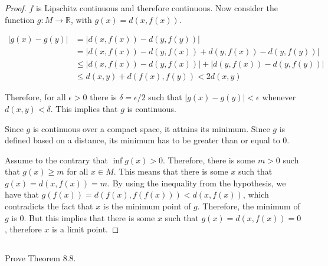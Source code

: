 \begin{proof}
$f$ is Lipschitz continuous and therefore continuous. Now consider the function $g:M \rightarrow \mathbb{R}$, with $g(x) = d(x, f(x))$.

\begin{align*}
|g(x) - g(y)| &= |d(x,f(x)) - d(y, f(y))| \\
                &= |d(x,f(x)) - d(y, f(x)) + d(y, f(x)) - d(y, f(y))| \\
                &\leq |d(x,f(x)) - d(y, f(x))| + |d(y, f(x)) - d(y, f(y))| \\
                &\leq d(x,y) + d(f(x), f(y)) < 2d(x,y)
\end{align*}

Therefore, for all $\epsilon > 0$ there is $\delta = \epsilon/2$ such that $|g(x) - g(y)| < \epsilon$ whenever $d(x,y) < \delta$. This implies that $g$ is continuous.

Since $g$ is continuous over a compact space, it attains its minimum. Since $g$ is defined based on a distance, its minimum has to be greater than or equal to 0.

Assume to the contrary that $\inf g(x) > 0$. Therefore, there is some $m > 0$ such that $g(x) \geq m$ for all $x \in M$. This means that there is some $x$ such that $g(x) = d(x, f(x)) = m$. By using the inequality from the hypothesis, we have that $g(f(x)) = d(f(x), f(f(x))) < d(x, f(x))$, which contradicts the fact that $x$ is the minimum point of $g$. Therefore, the minimum of $g$ is 0. But this implies that there is some $x$ such that $g(x) = d(x, f(x)) = 0$, therefore $x$ is a limit point.

\end{proof}

\subsection{} Prove Theorem 8.8.

